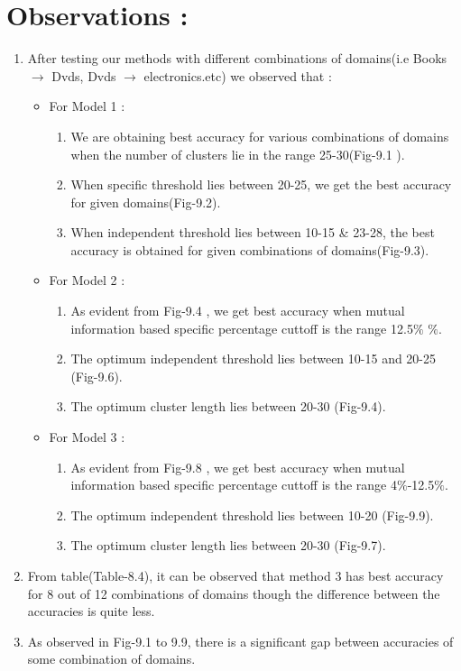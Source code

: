 \documentclass{report}
\begin{document}
\chapter{Observations :}
\begin{enumerate}[label=\Roman*.]
\item After testing our methods with different combinations of domains(i.e Books \(\rightarrow\) Dvds, Dvds \(\rightarrow\) electronics.etc) we observed that : 
\begin{itemize}[label=$\diamond$]
\item For Model 1 :
\begin{enumerate}[label=\arabic*.]
\item We are obtaining best accuracy for various combinations of domains when the number of clusters lie in the range 25-30(Fig-9.1 ).
\item When specific threshold lies between 20-25, we get the best accuracy for given domains(Fig-9.2).
\item When independent threshold lies between 10-15 \& 23-28, the best accuracy is obtained for given combinations of domains(Fig-9.3).
\end{enumerate}

\item For Model 2 :
\begin{enumerate}[label=\arabic*.]
\item As evident from Fig-9.4 , we get best accuracy when mutual information based specific percentage cuttoff is the range 12.5\( \% \)  \( \% \).
\item The optimum independent threshold lies between 10-15 and 20-25 (Fig-9.6).
\item The optimum cluster length lies between 20-30 (Fig-9.4).
\end{enumerate}

\item For Model 3 :
\begin{enumerate}[label=\arabic*.]
\item As evident from Fig-9.8 , we get best accuracy when mutual information based specific percentage cuttoff is the range 4\(\%\)-12.5\(\%\).
\item The optimum independent threshold lies between 10-20 (Fig-9.9).
\item The optimum cluster length lies between 20-30 (Fig-9.7).
\end{enumerate}
\end{itemize}

\item From table(Table-8.4), it can be observed that method 3 has best accuracy for 8 out of 12 combinations of domains though the difference between the accuracies is quite less.

\item As observed in Fig-9.1 to 9.9, there is a significant gap between accuracies of some combination of domains.
\end{enumerate}
\end{document}
